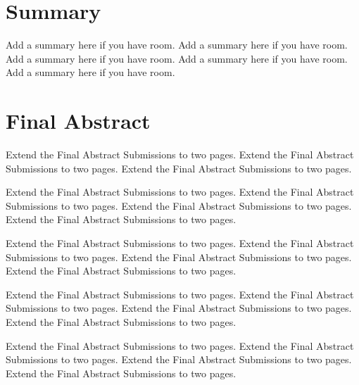 \documentclass{irmmwthzconf}
\begin{document}
\section{Summary}

Add a summary here if you have room. Add a summary here if you have room. Add a summary here if you have room. Add a summary here if you have room. Add a summary here if you have room.

\section{Final Abstract}

Extend the Final Abstract Submissions to two pages. Extend the Final Abstract Submissions to two pages. Extend the Final Abstract Submissions to two pages.

Extend the Final Abstract Submissions to two pages. Extend the Final Abstract Submissions to two pages. Extend the Final Abstract Submissions to two pages. Extend the Final Abstract Submissions to two pages.

Extend the Final Abstract Submissions to two pages. Extend the Final Abstract Submissions to two pages. Extend the Final Abstract Submissions to two pages. Extend the Final Abstract Submissions to two pages.

Extend the Final Abstract Submissions to two pages. Extend the Final Abstract Submissions to two pages. Extend the Final Abstract Submissions to two pages. Extend the Final Abstract Submissions to two pages.

Extend the Final Abstract Submissions to two pages. Extend the Final Abstract Submissions to two pages. Extend the Final Abstract Submissions to two pages. Extend the Final Abstract Submissions to two pages.~\cite{sample, so2012recent, topsakal2011}



\end{document}
